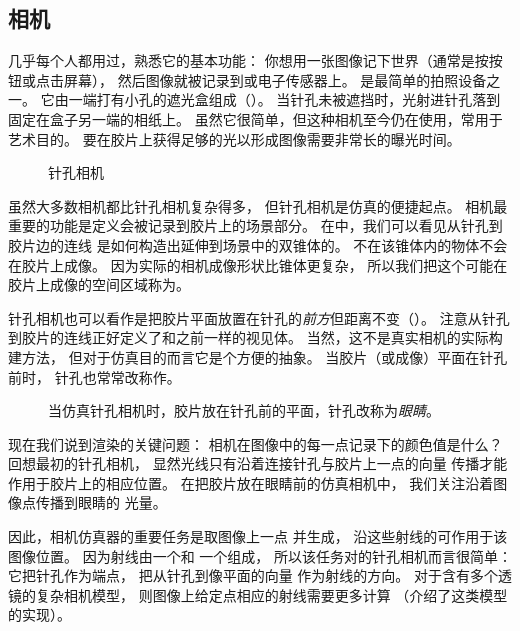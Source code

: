 \subsection{相机}\label{sub:相机}

几乎每个人都用过，熟悉它的基本功能：
你想用一张图像记下世界（通常是按按钮或点击屏幕），
然后图像就被记录到或电子传感器上。
是最简单的拍照设备之一。
它由一端打有小孔的遮光盒组成（）。
当针孔未被遮挡时，光射进针孔落到固定在盒子另一端的相纸上。
虽然它很简单，但这种相机至今仍在使用，常用于艺术目的。
要在胶片上获得足够的光以形成图像需要非常长的曝光时间。
\begin{figure}
      \centering
      \caption{针孔相机}\label{fig:1.1}
\end{figure}

虽然大多数相机都比针孔相机复杂得多，
但针孔相机是仿真的便捷起点。
相机最重要的功能是定义会被记录到胶片上的场景部分。
在中，我们可以看见从针孔到胶片边的连线
是如何构造出延伸到场景中的双锥体的。
不在该锥体内的物体不会在胶片上成像。
因为实际的相机成像形状比锥体更复杂，
所以我们把这个可能在胶片上成像的空间区域称为。

针孔相机也可以看作是把胶片平面放置在针孔的\emph{前方}但距离不变（）。
注意从针孔到胶片的连线正好定义了和之前一样的视见体。
当然，这不是真实相机的实际构建方法，
但对于仿真目的而言它是个方便的抽象。
当胶片（或成像）平面在针孔前时，
针孔也常常改称作。
\begin{figure}
      \centering
      \caption{当仿真针孔相机时，胶片放在针孔前的平面，针孔改称为\emph{眼睛}。}\label{fig:1.2}
\end{figure}

现在我们说到渲染的关键问题：
相机在图像中的每一点记录下的颜色值是什么？
回想最初的针孔相机，
显然光线只有沿着连接针孔与胶片上一点的向量
传播才能作用于胶片上的相应位置。
在把胶片放在眼睛前的仿真相机中，
我们关注沿着图像点传播到眼睛的
光量。

因此，相机仿真器的重要任务是取图像上一点
并生成，
沿这些射线的可作用于该图像位置。
因为射线由一个和
一个组成，
所以该任务对的针孔相机而言很简单：
它把针孔作为端点，
把从针孔到像平面的向量
作为射线的方向。
对于含有多个透镜的复杂相机模型，
则图像上给定点相应的射线需要更多计算
（介绍了这类模型的实现）。


